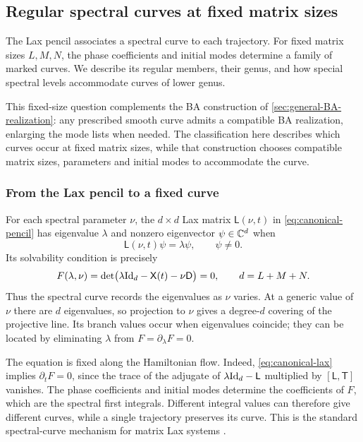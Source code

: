 \subsection{Regular spectral curves at fixed matrix sizes}
\label{sec:spectral-geometry}

The Lax pencil associates a spectral curve to each trajectory. For
fixed matrix sizes $L,M,N$, the phase coefficients and initial modes
determine a family of marked curves. We describe its regular members,
their genus, and how special spectral levels accommodate curves of
lower genus.

This fixed-size question complements the BA construction of
\cref{sec:general-BA-realization}: any prescribed smooth curve admits
a compatible BA realization, enlarging the mode lists when needed.
The classification here describes which curves occur at fixed matrix
sizes, while that construction chooses compatible matrix sizes,
parameters and initial modes to accommodate the curve.

\subsubsection{From the Lax pencil to a fixed curve}

For each spectral parameter $\nu$, the $d\times d$ Lax matrix
$\mathsf L(\nu,t)$ in \cref{eq:canonical-pencil} has eigenvalue
$\lambda$ and nonzero eigenvector $\psi\in\mathbb C^d$ when
\begin{equation}\label{eq:geometry-eigenvalue}
 \mathsf L(\nu,t)\psi=\lambda\psi,\qquad \psi\ne0.
\end{equation}
Its solvability condition is precisely
\begin{equation}\label{eq:geometry-affine}
 F(\lambda,\nu)=\det\bigl(\lambda\mathrm{Id}_d-\mathsf X(t)-\nu\mathsf D\bigr)=0,
 \qquad d=L+M+N.
\end{equation}
Thus the spectral curve records the eigenvalues as $\nu$ varies.
At a generic value of $\nu$ there are $d$ eigenvalues, so projection
to $\nu$ gives a degree-$d$ covering of the projective line.
Its branch values occur when eigenvalues coincide; they can be
located by eliminating $\lambda$ from $F=\partial_\lambda F=0$.

The equation is fixed along the Hamiltonian flow. Indeed,
\cref{eq:canonical-lax} implies $\partial_tF=0$, since
the trace of the adjugate of $\lambda\mathrm{Id}_d-\mathsf L$ multiplied
by $[\mathsf L,\mathsf T]$ vanishes. The phase coefficients and
initial modes determine the coefficients of $F$, which are the
spectral first integrals. Different integral values can therefore
give different curves, while a single trajectory preserves its curve.
This is the standard spectral-curve mechanism for matrix Lax systems
\cite{JRW1991,Beauville1990,AdlerVanMoerbeke2018}.

